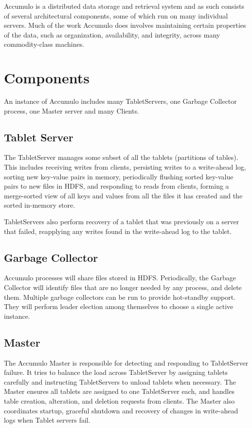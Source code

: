 Accumulo is a distributed data storage and retrieval system and as such consists of
several architectural components, some of which run on many individual servers.
Much of the work Accumulo does involves maintaining certain properties of the
data, such as organization, availability, and integrity, across many commodity-class
machines.

\section{Components}

An instance of Accumulo includes many TabletServers, one Garbage Collector process, 
one Master server and many Clients.

\subsection{Tablet Server}

The TabletServer manages some subset of all the tablets (partitions of tables). This includes receiving writes from clients, persisting writes to a
write-ahead log, sorting new key-value pairs in memory, periodically
flushing sorted key-value pairs to new files in HDFS, and responding
to reads from clients, forming a merge-sorted view of all keys and
values from all the files it has created and the sorted in-memory
store.

TabletServers also perform recovery of a tablet
that was previously on a server that failed, reapplying any writes
found in the write-ahead log to the tablet.

\subsection{Garbage Collector}

Accumulo processes will share files stored in HDFS. Periodically, the Garbage
Collector will identify files that are no longer needed by any process, and
delete them. Multiple garbage collectors can be run to provide hot-standby support.
They will perform leader election among themselves to choose a single active instance.

\subsection{Master}

The Accumulo Master is responsible for detecting and responding to TabletServer
failure. It tries to balance the load across TabletServer by assigning tablets carefully
and instructing TabletServers to unload tablets when necessary. The Master ensures all
tablets are assigned to one TabletServer each, and handles table creation, alteration,
and deletion requests from clients. The Master also coordinates startup, graceful
shutdown and recovery of changes in write-ahead logs when Tablet servers fail.

